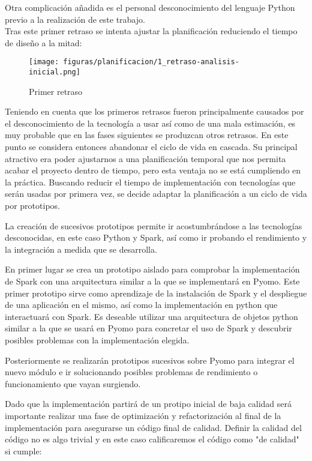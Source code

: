 Otra complicación añadida es el personal desconocimiento del lenguaje Python previo a la realización de este trabajo.\\

Tras este primer retraso se intenta ajustar la planificación reduciendo el tiempo de diseño a la mitad:

\begin{figure}[H]
    \centerline{\texttt{[image: figuras/planificacion/1\_retraso-analisis-inicial.png]}}
    \caption{Primer retraso}
\end{figure}

Teniendo en cuenta que los primeros retrasos fueron principalmente causados por el desconocimiento de la tecnología a usar así como de una mala estimación, es muy probable que en las fases siguientes se produzcan otros retrasos. En este punto se considera entonces abandonar el ciclo de vida en cascada. Su principal atractivo era poder ajustarnos a una planificación temporal que nos permita acabar el proyecto dentro de tiempo, pero esta ventaja no se está cumpliendo en la práctica. Buscando reducir el tiempo de implementación con tecnologías que serán usadas por primera vez, se decide adaptar la planificación a un ciclo de vida por prototipos. 

La creación de sucesivos prototipos permite ir acostumbrándose a las tecnologías desconocidas, en este caso Python y Spark, así como ir probando el rendimiento y la integración a medida que se desarrolla.

En primer lugar se crea un prototipo aislado para comprobar la implementación de Spark con una arquitectura similar a la que se implementará en Pyomo. Este primer prototipo sirve como aprendizaje de la instalación de Spark y el despliegue de una aplicación en el mismo, así como la implementación en python que interactuará con Spark. Es deseable utilizar una arquitectura de objetos python similar a la que se usará en Pyomo para concretar el uso de Spark y descubrir posibles problemas con la implementación elegida.

Posteriormente se realizarán prototipos sucesivos sobre Pyomo para integrar el nuevo módulo e ir solucionando posibles problemas de rendimiento o funcionamiento que vayan surgiendo. 

Dado que la implementación partirá de un protipo inicial de baja calidad será importante realizar una fase de optimización y refactorización al final de la implementación para asegurarse un código final de calidad. Definir la calidad del código no es algo trivial y en este caso calificaremos el código como "de calidad" si cumple:

